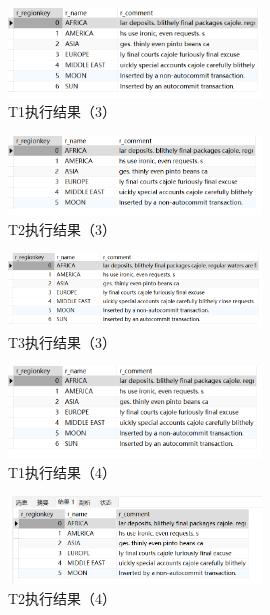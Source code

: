 \documentclass{article}
\begin{document}
\begin{figure}[H]
  \centering
  \includegraphics[width=0.6\textwidth]{img/19.png}
  \caption{T1执行结果（3）}
\end{figure}

\begin{figure}[H]
  \centering
  \includegraphics[width=0.6\textwidth]{img/20.png}
  \caption{T2执行结果（3）}
\end{figure}

\begin{figure}[H]
  \centering
  \includegraphics[width=0.6\textwidth]{img/21.png}
  \caption{T3执行结果（3）}
\end{figure}

\begin{figure}[H]
  \centering
  \includegraphics[width=0.6\textwidth]{img/22.png}
  \caption{T1执行结果（4）}
\end{figure}

\begin{figure}[H]
  \centering
  \includegraphics[width=0.6\textwidth]{img/23.png}
  \caption{T2执行结果（4）}
\end{figure}
\end{document}
